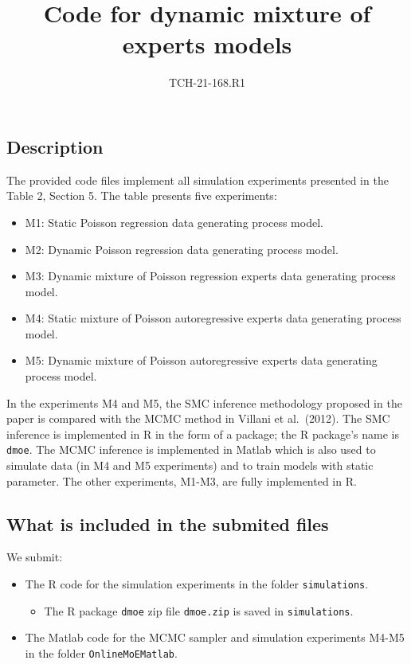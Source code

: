 \documentclass[
]{article}
\title{Code for dynamic mixture of experts models}
\subtitle{TCH-21-168.R1}
\author{}
\date{\vspace{-2.5em}}
\providecommand{\tightlist}{%
  \setlength{\itemsep}{0pt}\setlength{\parskip}{0pt}}
\begin{document}
\maketitle

\hypertarget{description}{%
\subsection{Description}\label{description}}

The provided code files implement all simulation experiments presented
in the Table 2, Section 5. The table presents five experiments:

\begin{itemize}
\tightlist
\item
  M1: Static Poisson regression data generating process model.
\item
  M2: Dynamic Poisson regression data generating process model.
\item
  M3: Dynamic mixture of Poisson regression experts data generating
  process model.
\item
  M4: Static mixture of Poisson autoregressive experts data generating
  process model.
\item
  M5: Dynamic mixture of Poisson autoregressive experts data generating
  process model.
\end{itemize}

In the experiments M4 and M5, the SMC inference methodology proposed in
the paper is compared with the MCMC method in Villani et al.~(2012). The
SMC inference is implemented in R in the form of a package; the R
package's name is \texttt{dmoe}. The MCMC inference is implemented in
Matlab which is also used to simulate data (in M4 and M5 experiments)
and to train models with static parameter. The other experiments, M1-M3,
are fully implemented in R.

\hypertarget{what-is-included-in-the-submited-files}{%
\subsection{What is included in the submited
files}\label{what-is-included-in-the-submited-files}}

We submit:

\begin{itemize}
\tightlist
\item
  The R code for the simulation experiments in the folder
  \texttt{simulations}.

  \begin{itemize}
  \tightlist
  \item
    The R package \texttt{dmoe} zip file \texttt{dmoe.zip} is saved in
    \texttt{simulations}.
  \end{itemize}
\item
  The Matlab code for the MCMC sampler and simulation experiments M4-M5
  in the folder \texttt{OnlineMoEMatlab}.
\end{itemize}
\end{document}
